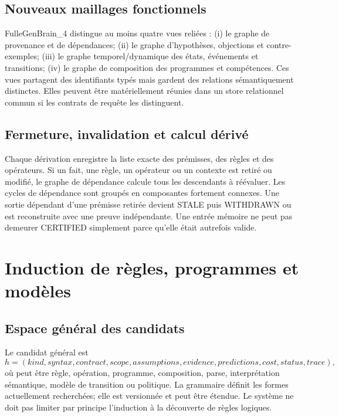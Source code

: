 \documentclass[11pt,a4paper]{article}
\newcommand{\code}[1]{\path{#1}}
\newcommand{\State}[1]{\textsf{#1}}
\begin{document}
\subsection{Nouveaux maillages fonctionnels}
FulleGenBrain\_4 distingue au moins quatre vues reliées : (i) le graphe de provenance et de dépendances; (ii) le graphe d'hypothèses, objections et contre-exemples; (iii) le graphe temporel/dynamique des états, événements et transitions; (iv) le graphe de composition des programmes et compétences. Ces vues partagent des identifiants typés mais gardent des relations sémantiquement distinctes. Elles peuvent être matériellement réunies dans un store relationnel commun si les contrats de requête les distinguent.

\subsection{Fermeture, invalidation et calcul dérivé}
Chaque dérivation enregistre la liste exacte des prémisses, des règles et des opérateurs. Si un fait, une règle, un opérateur ou un contexte est retiré ou modifié, le graphe de dépendance calcule tous les descendants à réévaluer. Les cycles de dépendance sont groupés en composantes fortement connexes. Une sortie dépendant d'une prémisse retirée devient \State{STALE} puis \State{WITHDRAWN} ou est reconstruite avec une preuve indépendante. Une entrée mémoire ne peut pas demeurer \State{CERTIFIED} simplement parce qu'elle était autrefois valide.

\section{Induction de règles, programmes et modèles}
\subsection{Espace général des candidats}
Le candidat général est
\[
h=(kind,syntax,contract,scope,assumptions,evidence,predictions,cost,status,trace),
\]
où \code{kind} peut être règle, opération, programme, composition, parse, interprétation sémantique, modèle de transition ou politique. La grammaire définit les formes actuellement recherchées; elle est versionnée et peut être étendue. Le système ne doit pas limiter par principe l'induction à la découverte de règles logiques.
\end{document}
